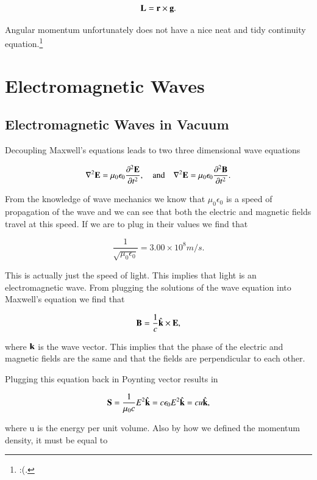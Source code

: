 \documentclass[preprint, review,12pt]{elsarticle}
\def\x{\times}
\def\b{\textbf}
\def\lap{\nabla^2}
\def\and{\quad \text{and} \quad}
\newcommand{\pds}[2]{\frac{\partial^2 #1 }{\partial {#2}^2}}
\newcommand{\hb}[1]{\hat{\b #1}}
\begin{document}
\begin{equation}
    \b L = \b r \x \b g.
\end{equation}

Angular momentum unfortunately does not have a nice neat and tidy continuity equation.\footnote{:(.}

\section{Electromagnetic Waves}

\subsection{Electromagnetic Waves in Vacuum}

Decoupling Maxwell's equations leads to two three dimensional wave equations

\begin{equation}
    \lap \b E = \mu_0 \epsilon_0 \pds{\b E}{t}, \and \lap \b E = \mu_0 \epsilon_0 \pds{\b B}{t}.
\end{equation}

From the knowledge of wave mechanics we know that $\mu_0 \epsilon_0$ is a speed of propagation of the wave and we can see that both the electric and magnetic fields travel at this speed. If we are to plug in their values we find that

\begin{equation}
    \frac{1}{\sqrt{\mu_0 \epsilon_0}} = 3.00 \x 10^8 m/s.
\end{equation}

This is actually just the speed of light. This implies that light is an electromagnetic wave. From plugging the solutions of the wave equation into Maxwell's equation we find that 

\begin{equation}
    \b B = \frac{1}{c} \hb{k} \x \b E,
\end{equation}

where $\b k$ is the wave vector. This implies that the phase of the electric and magnetic fields are the same and that the fields are perpendicular to each other. 

Plugging this equation back in Poynting vector results in

\begin{equation}
    \b S = \frac{1}{\mu_0c}E^2\hb{k} = c\epsilon_0 E^2 \hb{k} = cu \hb{k},
\end{equation}

where u is the energy per unit volume. Also by how we defined the momentum density, it must be equal to 
\end{document}
